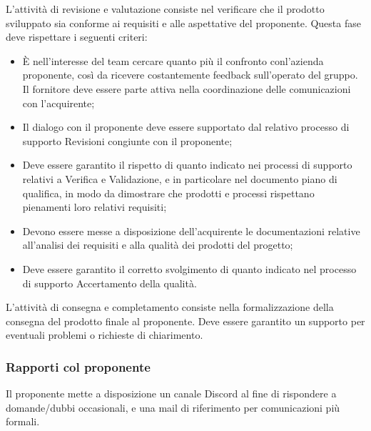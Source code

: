 L'attività di revisione e valutazione consiste nel verificare che il prodotto sviluppato sia conforme ai requisiti e alle aspettative del proponente. Questa fase deve rispettare i seguenti criteri:
\begin{itemize}
    \item È nell’interesse del team cercare quanto più il confronto conl’azienda proponente, così da ricevere costantemente feedback sull’operato del gruppo. Il fornitore deve essere parte attiva nella coordinazione delle comunicazioni con l’acquirente;
    \item Il dialogo con il proponente deve essere supportato dal relativo processo di supporto Revisioni congiunte con il proponente;
    \item Deve essere garantito il rispetto di quanto indicato nei processi di supporto relativi a Verifica e Validazione, e in particolare nel documento piano di qualifica, in modo da dimostrare che prodotti e processi rispettano pienamenti loro relativi requisiti;
    \item Devono essere messe a disposizione dell’acquirente le documentazioni relative all’analisi dei requisiti e alla qualità dei prodotti del progetto;
    \item Deve essere garantito il corretto svolgimento di quanto indicato nel processo di supporto Accertamento della qualità.
\end{itemize}

L'attività di consegna e completamento consiste nella formalizzazione della consegna del prodotto finale al proponente. Deve essere garantito un supporto per eventuali problemi o richieste di chiarimento.


\subsubsection{Rapporti col proponente}
Il proponente mette a disposizione un canale Discord al fine di rispondere a domande/dubbi occasionali, e una mail di riferimento per comunicazioni più formali.

